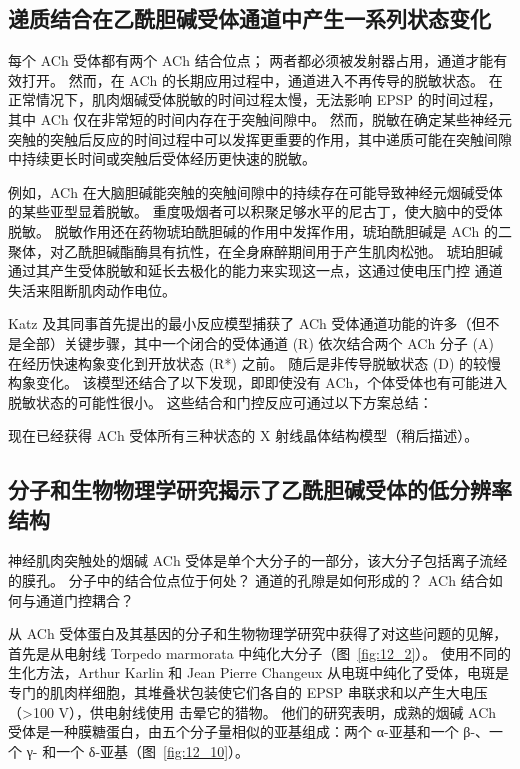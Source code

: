 \subsection{递质结合在乙酰胆碱受体通道中产生一系列状态变化}

每个 ACh 受体都有两个 ACh 结合位点；
两者都必须被发射器占用，通道才能有效打开。
然而，在 ACh 的长期应用过程中，通道进入不再传导的脱敏状态。
在正常情况下，肌肉烟碱受体脱敏的时间过程太慢，无法影响 EPSP 的时间过程，其中 ACh 仅在非常短的时间内存在于突触间隙中。
然而，脱敏在确定某些神经元突触的突触后反应的时间过程中可以发挥更重要的作用，其中递质可能在突触间隙中持续更长时间或突触后受体经历更快速的脱敏。


例如，ACh 在大脑胆碱能突触的突触间隙中的持续存在可能导致神经元烟碱受体的某些亚型显着脱敏。
重度吸烟者可以积聚足够水平的尼古丁，使大脑中的受体脱敏。
脱敏作用还在药物琥珀酰胆碱的作用中发挥作用，琥珀酰胆碱是 ACh 的二聚体，对乙酰胆碱酯酶具有抗性，在全身麻醉期间用于产生肌肉松弛。
琥珀胆碱通过其产生受体脱敏和延长去极化的能力来实现这一点，这通过使电压门控  通道失活来阻断肌肉动作电位。


Katz 及其同事首先提出的最小反应模型捕获了 ACh 受体通道功能的许多（但不是全部）关键步骤，其中一个闭合的受体通道 (R) 依次结合两个 ACh 分子 (A) 在经历快速构象变化到开放状态 (R*) 之前。
随后是非传导脱敏状态 (D) 的较慢构象变化。
该模型还结合了以下发现，即即使没有 ACh，个体受体也有可能进入脱敏状态的可能性很小。
这些结合和门控反应可通过以下方案总结：


现在已经获得 ACh 受体所有三种状态的 X 射线晶体结构模型（稍后描述）。



\subsection{分子和生物物理学研究揭示了乙酰胆碱受体的低分辨率结构}

神经肌肉突触处的烟碱 ACh 受体是单个大分子的一部分，该大分子包括离子流经的膜孔。
分子中的结合位点位于何处？ 通道的孔隙是如何形成的？ ACh 结合如何与通道门控耦合？


从 ACh 受体蛋白及其基因的分子和生物物理学研究中获得了对这些问题的见解，首先是从电射线 Torpedo marmorata 中纯化大分子（图~\ref{fig:12_2}）。
使用不同的生化方法，Arthur Karlin 和 Jean Pierre Changeux 从电斑中纯化了受体，电斑是专门的肌肉样细胞，其堆叠状包装使它们各自的 EPSP 串联求和以产生大电压（>100 V），供电射线使用 击晕它的猎物。
他们的研究表明，成熟的烟碱 ACh 受体是一种膜糖蛋白，由五个分子量相似的亚基组成：两个 α-亚基和一个 β-、一个 γ- 和一个 δ-亚基（图~\ref{fig:12_10}）。


